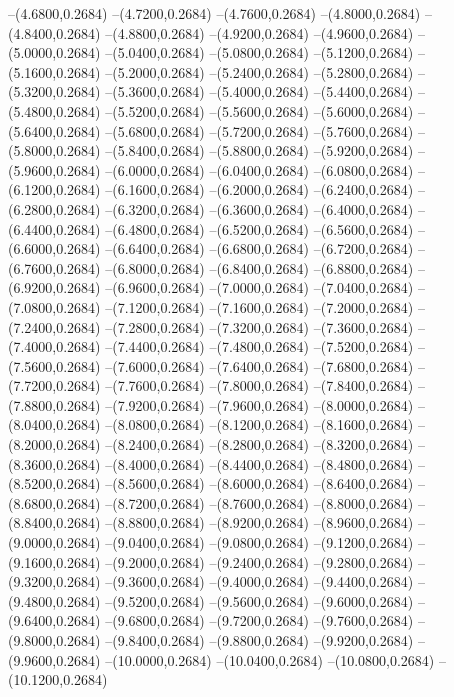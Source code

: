 {	--(4.6800,0.2684)
	--(4.7200,0.2684)
	--(4.7600,0.2684)
	--(4.8000,0.2684)
	--(4.8400,0.2684)
	--(4.8800,0.2684)
	--(4.9200,0.2684)
	--(4.9600,0.2684)
	--(5.0000,0.2684)
	--(5.0400,0.2684)
	--(5.0800,0.2684)
	--(5.1200,0.2684)
	--(5.1600,0.2684)
	--(5.2000,0.2684)
	--(5.2400,0.2684)
	--(5.2800,0.2684)
	--(5.3200,0.2684)
	--(5.3600,0.2684)
	--(5.4000,0.2684)
	--(5.4400,0.2684)
	--(5.4800,0.2684)
	--(5.5200,0.2684)
	--(5.5600,0.2684)
	--(5.6000,0.2684)
	--(5.6400,0.2684)
	--(5.6800,0.2684)
	--(5.7200,0.2684)
	--(5.7600,0.2684)
	--(5.8000,0.2684)
	--(5.8400,0.2684)
	--(5.8800,0.2684)
	--(5.9200,0.2684)
	--(5.9600,0.2684)
	--(6.0000,0.2684)
	--(6.0400,0.2684)
	--(6.0800,0.2684)
	--(6.1200,0.2684)
	--(6.1600,0.2684)
	--(6.2000,0.2684)
	--(6.2400,0.2684)
	--(6.2800,0.2684)
	--(6.3200,0.2684)
	--(6.3600,0.2684)
	--(6.4000,0.2684)
	--(6.4400,0.2684)
	--(6.4800,0.2684)
	--(6.5200,0.2684)
	--(6.5600,0.2684)
	--(6.6000,0.2684)
	--(6.6400,0.2684)
	--(6.6800,0.2684)
	--(6.7200,0.2684)
	--(6.7600,0.2684)
	--(6.8000,0.2684)
	--(6.8400,0.2684)
	--(6.8800,0.2684)
	--(6.9200,0.2684)
	--(6.9600,0.2684)
	--(7.0000,0.2684)
	--(7.0400,0.2684)
	--(7.0800,0.2684)
	--(7.1200,0.2684)
	--(7.1600,0.2684)
	--(7.2000,0.2684)
	--(7.2400,0.2684)
	--(7.2800,0.2684)
	--(7.3200,0.2684)
	--(7.3600,0.2684)
	--(7.4000,0.2684)
	--(7.4400,0.2684)
	--(7.4800,0.2684)
	--(7.5200,0.2684)
	--(7.5600,0.2684)
	--(7.6000,0.2684)
	--(7.6400,0.2684)
	--(7.6800,0.2684)
	--(7.7200,0.2684)
	--(7.7600,0.2684)
	--(7.8000,0.2684)
	--(7.8400,0.2684)
	--(7.8800,0.2684)
	--(7.9200,0.2684)
	--(7.9600,0.2684)
	--(8.0000,0.2684)
	--(8.0400,0.2684)
	--(8.0800,0.2684)
	--(8.1200,0.2684)
	--(8.1600,0.2684)
	--(8.2000,0.2684)
	--(8.2400,0.2684)
	--(8.2800,0.2684)
	--(8.3200,0.2684)
	--(8.3600,0.2684)
	--(8.4000,0.2684)
	--(8.4400,0.2684)
	--(8.4800,0.2684)
	--(8.5200,0.2684)
	--(8.5600,0.2684)
	--(8.6000,0.2684)
	--(8.6400,0.2684)
	--(8.6800,0.2684)
	--(8.7200,0.2684)
	--(8.7600,0.2684)
	--(8.8000,0.2684)
	--(8.8400,0.2684)
	--(8.8800,0.2684)
	--(8.9200,0.2684)
	--(8.9600,0.2684)
	--(9.0000,0.2684)
	--(9.0400,0.2684)
	--(9.0800,0.2684)
	--(9.1200,0.2684)
	--(9.1600,0.2684)
	--(9.2000,0.2684)
	--(9.2400,0.2684)
	--(9.2800,0.2684)
	--(9.3200,0.2684)
	--(9.3600,0.2684)
	--(9.4000,0.2684)
	--(9.4400,0.2684)
	--(9.4800,0.2684)
	--(9.5200,0.2684)
	--(9.5600,0.2684)
	--(9.6000,0.2684)
	--(9.6400,0.2684)
	--(9.6800,0.2684)
	--(9.7200,0.2684)
	--(9.7600,0.2684)
	--(9.8000,0.2684)
	--(9.8400,0.2684)
	--(9.8800,0.2684)
	--(9.9200,0.2684)
	--(9.9600,0.2684)
	--(10.0000,0.2684)
	--(10.0400,0.2684)
	--(10.0800,0.2684)
	--(10.1200,0.2684)
}
